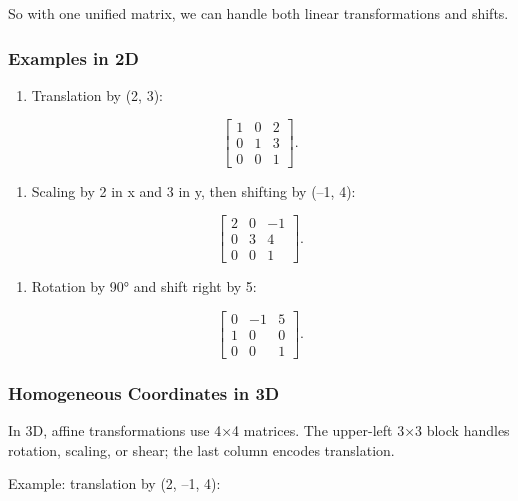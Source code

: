 \documentclass[
  letterpaper,
  DIV=11,
  numbers=noendperiod]{scrreprt}
\providecommand{\tightlist}{%
  \setlength{\itemsep}{0pt}\setlength{\parskip}{0pt}}
\begin{document}
So with one unified matrix, we can handle both linear transformations
and shifts.

\subsubsection{Examples in 2D}\label{examples-in-2d}

\begin{enumerate}
\def\labelenumi{\arabic{enumi}.}
\tightlist
\item
  Translation by (2, 3):
\end{enumerate}

\[
\begin{bmatrix} 
1 & 0 & 2 \\ 
0 & 1 & 3 \\ 
0 & 0 & 1 
\end{bmatrix}.
\]

\begin{enumerate}
\def\labelenumi{\arabic{enumi}.}
\setcounter{enumi}{1}
\tightlist
\item
  Scaling by 2 in x and 3 in y, then shifting by (--1, 4):
\end{enumerate}

\[
\begin{bmatrix} 
2 & 0 & -1 \\ 
0 & 3 & 4 \\ 
0 & 0 & 1 
\end{bmatrix}.
\]

\begin{enumerate}
\def\labelenumi{\arabic{enumi}.}
\setcounter{enumi}{2}
\tightlist
\item
  Rotation by 90° and shift right by 5:
\end{enumerate}

\[
\begin{bmatrix} 
0 & -1 & 5 \\ 
1 & 0 & 0 \\ 
0 & 0 & 1 
\end{bmatrix}.
\]

\subsubsection{Homogeneous Coordinates in
3D}\label{homogeneous-coordinates-in-3d}

In 3D, affine transformations use 4×4 matrices. The upper-left 3×3 block
handles rotation, scaling, or shear; the last column encodes
translation.

Example: translation by (2, --1, 4):
\end{document}
